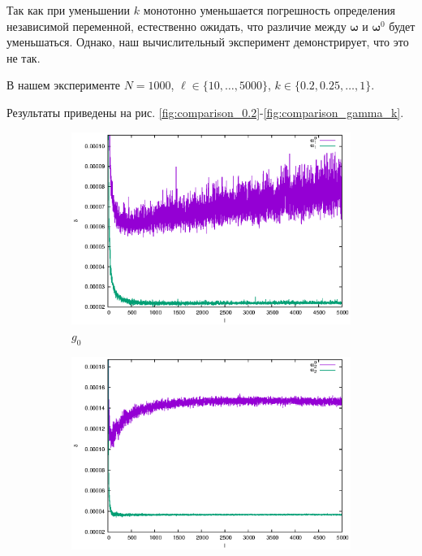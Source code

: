 \documentclass[tikz,10pt,a4paper]{article}
\newcommand{\bomega}{\boldsymbol{\omega}}
\begin{document}
Так как при уменьшении $k$ монотонно уменьшается погрешность определения независимой
переменной, естественно ожидать, что различие между $\bomega$ и $\bomega^0$ будет
уменьшаться. Однако, наш вычислительный эксперимент демонстрирует, что это не так.

В нашем эксперименте $N = 1000$, $\ell \in \{ 10, \dots, 5000 \}$,
$k \in \{ 0.2, 0.25, \dots, 1 \}$.

Результаты приведены на рис. \ref{fig:comparison_0.2}-\ref{fig:comparison_gamma_k}.

\begin{figure}[h]
  \centering
  \begin{subfigure}[b]{0.35\textwidth}
    \includegraphics[width=\textwidth]{figs/levmar/comparison/comparison_5000_1000_xsigma0.20_float.txt_parameter1.eps}
	\caption{$g_0$}
  \end{subfigure}%
  \begin{subfigure}[b]{0.35\textwidth}
    \includegraphics[width=\textwidth]{figs/levmar/comparison/comparison_5000_1000_xsigma0.20_float.txt_parameter2.eps}

\end{subfigure}
\end{figure}
\end{document}
